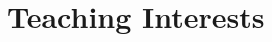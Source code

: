 \documentclass[11pt]{article}
\begin{document}
   
   

\section{Teaching Interests}



\end{document}
